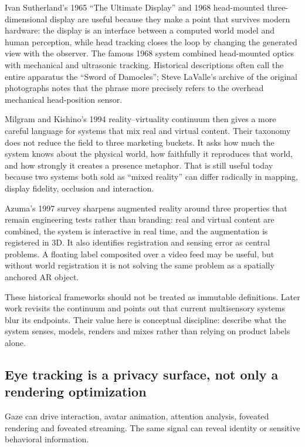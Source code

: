 Ivan Sutherland's 1965 ``The Ultimate Display'' and 1968 head-mounted three-dimensional display are useful because they make a point that survives modern hardware: the display is an interface between a computed world model and human perception, while head tracking closes the loop by changing the generated view with the observer. The famous 1968 system combined head-mounted optics with mechanical and ultrasonic tracking. Historical descriptions often call the entire apparatus the ``Sword of Damocles''; Steve LaValle's archive of the original photographs notes that the phrase more precisely refers to the overhead mechanical head-position sensor.

Milgram and Kishino's 1994 reality--virtuality continuum then gives a more careful language for systems that mix real and virtual content. Their taxonomy does not reduce the field to three marketing buckets. It asks how much the system knows about the physical world, how faithfully it reproduces that world, and how strongly it creates a presence metaphor. That is still useful today because two systems both sold as ``mixed reality'' can differ radically in mapping, display fidelity, occlusion and interaction.

Azuma's 1997 survey sharpens augmented reality around three properties that remain engineering tests rather than branding: real and virtual content are combined, the system is interactive in real time, and the augmentation is registered in 3D. It also identifies registration and sensing error as central problems. A floating label composited over a video feed may be useful, but without world registration it is not solving the same problem as a spatially anchored AR object.

These historical frameworks should not be treated as immutable definitions. Later work revisits the continuum and points out that current multisensory systems blur its endpoints. Their value here is conceptual discipline: describe what the system senses, models, renders and mixes rather than relying on product labels alone.

\subsection{Eye tracking is a privacy surface, not only a rendering optimization}\label{eye-tracking-is-a-privacy-surface-not-only-a-rendering-optimization}

Gaze can drive interaction, avatar animation, attention analysis, foveated rendering and foveated streaming. The same signal can reveal identity or sensitive behavioral information.

